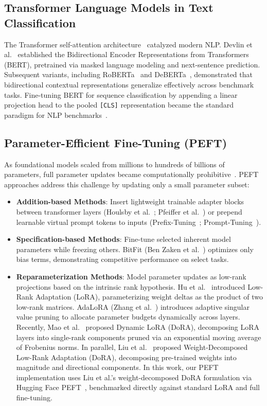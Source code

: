 \documentclass[conference]{IEEEtran}
\begin{document}
\subsection{Transformer Language Models in Text Classification}
The Transformer self-attention architecture~\cite{vaswani2017attention} catalyzed modern NLP. Devlin et al.~\cite{devlin2019bert} established the Bidirectional Encoder Representations from Transformers (BERT), pretrained via masked language modeling and next-sentence prediction. Subsequent variants, including RoBERTa~\cite{liu2019roberta} and DeBERTa~\cite{he2020deberta}, demonstrated that bidirectional contextual representations generalize effectively across benchmark tasks. Fine-tuning BERT for sequence classification by appending a linear projection head to the pooled \texttt{[CLS]} representation became the standard paradigm for NLP benchmarks~\cite{wang2018glue}.

\subsection{Parameter-Efficient Fine-Tuning (PEFT)}
As foundational models scaled from millions to hundreds of billions of parameters, full parameter updates became computationally prohibitive~\cite{ding2023peft_nature}. PEFT approaches address this challenge by updating only a small parameter subset:
\begin{itemize}
    \item \textbf{Addition-based Methods}: Insert lightweight trainable adapter blocks between transformer layers (Houlsby et al.~\cite{houlsby2019adapter}; Pfeiffer et al.~\cite{pfeiffer2021adapterfusion}) or prepend learnable virtual prompt tokens to inputs (Prefix-Tuning~\cite{li2021prefix}; Prompt-Tuning~\cite{lester2021prompt}).
    \item \textbf{Specification-based Methods}: Fine-tune selected inherent model parameters while freezing others. BitFit (Ben Zaken et al.~\cite{zaken2022bitfit}) optimizes only bias terms, demonstrating competitive performance on select tasks.
    \item \textbf{Reparameterization Methods}: Model parameter updates as low-rank projections based on the intrinsic rank hypothesis. Hu et al.~\cite{hu2022lora} introduced Low-Rank Adaptation (LoRA), parameterizing weight deltas as the product of two low-rank matrices. AdaLoRA (Zhang et al.~\cite{zhang2023adalora}) introduces adaptive singular value pruning to allocate parameter budgets dynamically across layers. Recently, Mao et al.~\cite{mao2024dora_dynamic} proposed Dynamic LoRA (DoRA), decomposing LoRA layers into single-rank components pruned via an exponential moving average of Frobenius norms. In parallel, Liu et al.~\cite{liu2024dora} proposed Weight-Decomposed Low-Rank Adaptation (DoRA), decomposing pre-trained weights into magnitude and directional components. In this work, our PEFT implementation uses Liu et al.'s weight-decomposed DoRA formulation via Hugging Face PEFT~\cite{peft2022}, benchmarked directly against standard LoRA and full fine-tuning.
\end{itemize}
\end{document}
